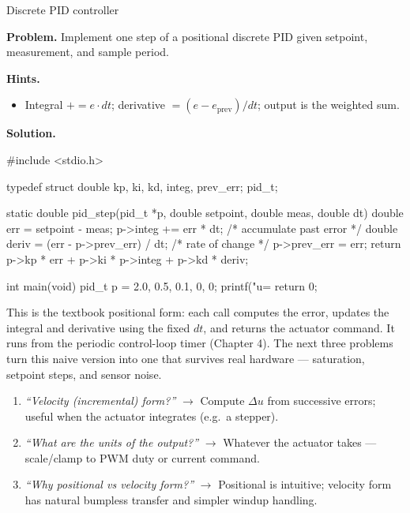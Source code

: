 \begin{gymproblem}{Discrete PID controller}

\textbf{Problem.} Implement one step of a positional discrete PID given
setpoint, measurement, and sample period.

\textbf{Hints.}
\begin{itemize}
\item Integral $+= e\cdot dt$; derivative $=(e-e_{\text{prev}})/dt$; output is
  the weighted sum.
\end{itemize}

\attempt

\textbf{Solution.}
\begin{cgym}
#include <stdio.h>

typedef struct { double kp, ki, kd, integ, prev_err; } pid_t;

static double pid_step(pid_t *p, double setpoint, double meas, double dt) {
    double err   = setpoint - meas;
    p->integ    += err * dt;                  /* accumulate past error  */
    double deriv = (err - p->prev_err) / dt;  /* rate of change         */
    p->prev_err  = err;
    return p->kp * err + p->ki * p->integ + p->kd * deriv;
}

int main(void) {
    pid_t p = {2.0, 0.5, 0.1, 0, 0};
    printf("u=%
    return 0;
}
\end{cgym}

This is the textbook positional form: each call computes the error, updates the
integral and derivative using the fixed $dt$, and returns the actuator command.
It runs from the periodic control-loop timer (Chapter 4). The next three problems
turn this naive version into one that survives real hardware --- saturation,
setpoint steps, and sensor noise.

\followups
\begin{enumerate}
\item \emph{``Velocity (incremental) form?''} $\rightarrow$ Compute $\Delta u$
  from successive errors; useful when the actuator integrates (e.g.\ a stepper).
\item \emph{``What are the units of the output?''} $\rightarrow$ Whatever the
  actuator takes --- scale/clamp to PWM duty or current command.
\item \emph{``Why positional vs velocity form?''} $\rightarrow$ Positional is
  intuitive; velocity form has natural bumpless transfer and simpler windup
  handling.
\end{enumerate}
\end{gymproblem}


